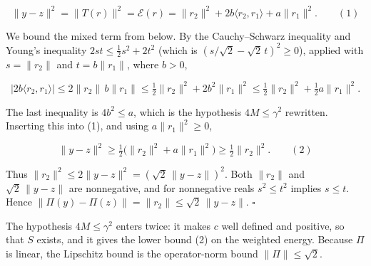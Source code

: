 \documentclass[11pt,a4paper]{article}
\begin{document}
\[\|y-z\|^2=\|T(r)\|^2=\mathcal E(r)=\|r_2\|^2+2b\langle r_2,r_1\rangle+a\|r_1\|^2.\qquad(1)\]


We bound the mixed term from below. By the Cauchy–Schwarz inequality and Young's inequality \(2st\le\tfrac12s^2+2t^2\) (which is \((s/\sqrt2-\sqrt2\,t)^2\ge0\)), applied with \(s=\|r_2\|\) and \(t=b\|r_1\|\), where \(b>0\),


\[\bigl|2b\langle r_2,r_1\rangle\bigr|\le2\|r_2\|\,b\|r_1\|\le\tfrac12\|r_2\|^2+2b^2\|r_1\|^2\le\tfrac12\|r_2\|^2+\tfrac12a\|r_1\|^2.\]


The last inequality is \(4b^2\le a\), which is the hypothesis \(4M\le\gamma^2\) rewritten. Inserting this into (1), and using \(a\|r_1\|^2\ge0\),


\[\|y-z\|^2\ge\tfrac12\bigl(\|r_2\|^2+a\|r_1\|^2\bigr)\ge\tfrac12\|r_2\|^2.\qquad(2)\]


Thus \(\|r_2\|^2\le2\|y-z\|^2=(\sqrt2\,\|y-z\|)^2\). Both \(\|r_2\|\) and \(\sqrt2\,\|y-z\|\) are nonnegative, and for nonnegative reals \(s^2\le t^2\) implies \(s\le t\). Hence \(\|\Pi(y)-\Pi(z)\|=\|r_2\|\le\sqrt2\,\|y-z\|\). \(\square\)




The hypothesis \(4M\le\gamma^2\) enters twice: it makes \(c\) well defined and positive, so that \(S\) exists, and it gives the lower bound (2) on the weighted energy. Because \(\Pi\) is linear, the Lipschitz bound is the operator-norm bound \(\|\Pi\|\le\sqrt2\).
\end{document}
